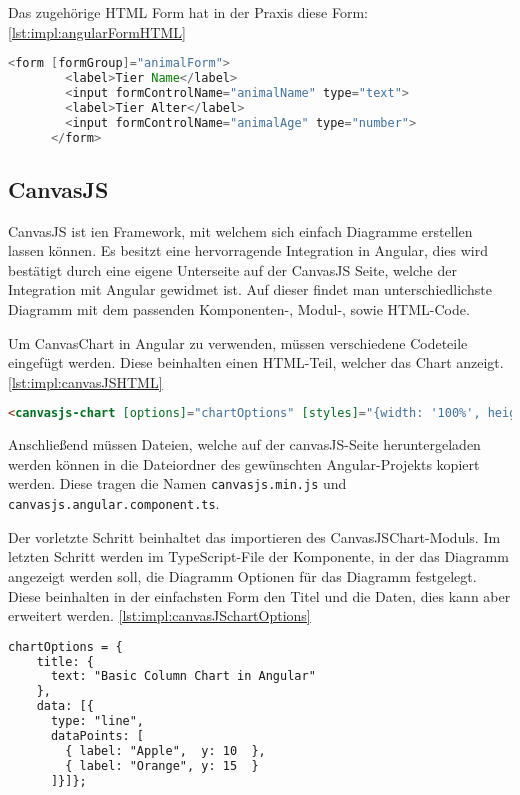 Das zugehörige HTML Form hat in der Praxis diese Form:  \ref{lst:impl:angularFormHTML}


\begin{lstlisting}[language=java,caption=Beispiel für ein reactives Formular,label=lst:impl:angularFormHTML]
  <form [formGroup]="animalForm">
        <label>Tier Name</label>
        <input formControlName="animalName" type="text">
        <label>Tier Alter</label>
        <input formControlName="animalAge" type="number">
      </form>
\end{lstlisting}



\subsection{CanvasJS}

CanvasJS ist ien Framework, mit welchem sich einfach Diagramme erstellen lassen können. Es besitzt eine hervorragende Integration in Angular, dies wird bestätigt durch eine eigene Unterseite auf der CanvasJS Seite, welche der Integration mit Angular gewidmet ist. Auf dieser findet man unterschiedlichste Diagramm mit dem passenden Komponenten-, Modul-, sowie HTML-Code.

Um CanvasChart in Angular zu verwenden, müssen verschiedene Codeteile eingefügt werden. Diese beinhalten einen HTML-Teil, welcher das Chart anzeigt. \ref{lst:impl:canvasJSHTML}

\begin{lstlisting}[language=html,caption=CanvasJS HTML,label=lst:impl:canvasJSHTML]
  <canvasjs-chart [options]="chartOptions" [styles]="{width: '100%', height: '360px'}"></canvasjs-chart>
\end{lstlisting}

Anschließend müssen Dateien, welche auf der canvasJS-Seite heruntergeladen werden können in die Dateiordner des gewünschten Angular-Projekts kopiert werden. Diese tragen die Namen \texttt{canvasjs.min.js} und \texttt{canvasjs.angular.component.ts}.

Der vorletzte Schritt beinhaltet das importieren des CanvasJSChart-Moduls.
Im letzten Schritt werden im TypeScript-File der Komponente, in der das Diagramm angezeigt werden soll, die Diagramm Optionen für das Diagramm festgelegt. Diese beinhalten in der einfachsten Form den Titel und die Daten, dies kann aber erweitert werden. \ref{lst:impl:canvasJSchartOptions}

\begin{lstlisting}[language=html,caption=CanvasJS chartOptiones,label=lst:impl:canvasJSchartOptions]
  chartOptions = {
    title: {
      text: "Basic Column Chart in Angular"
    },
    data: [{
      type: "line",
      dataPoints: [
        { label: "Apple",  y: 10  },
        { label: "Orange", y: 15  }
      ]}]};
\end{lstlisting}


